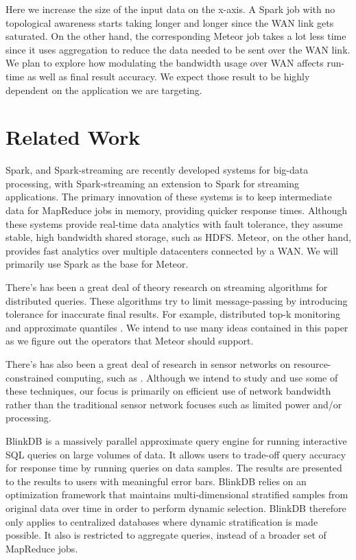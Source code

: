 \documentclass{article}
\begin{document}
Here we increase the size of the input data on the x-axis. A Spark job with no topological awareness starts taking longer and longer since the WAN link gets saturated. On the other hand, the corresponding Meteor job takes a lot less time since it uses aggregation to reduce the data needed to be sent over the WAN link. We plan to explore how modulating the bandwidth usage over WAN affects run-time as well as final result accuracy. We expect those result to be highly dependent on the application we are targeting.

\section{Related Work}

Spark, and Spark-streaming \cite{1} are recently developed systems for big-data processing, with Spark-streaming an extension to Spark for streaming applications. The primary innovation of these systems is to keep intermediate data for MapReduce jobs in memory, providing quicker response times. Although these systems provide real-time data analytics with fault tolerance, they assume stable, high bandwidth shared storage, such as HDFS. Meteor, on the other hand, provides fast analytics over multiple datacenters connected by a WAN. We will primarily use Spark as the base for Meteor.  

There’s has been a great deal of theory research on streaming algorithms for distributed queries. These algorithms try to limit message-passing by introducing tolerance for inaccurate final results. For example, distributed top-k monitoring \cite{3} and approximate quantiles \cite{6}. We intend to use many ideas contained in this paper as we figure out the operators that Meteor should support. 

There’s has also been a great deal of research in sensor networks on resource-constrained computing, such as \cite{7}. Although we intend to study and use some of these techniques, our focus is primarily on efficient use of network bandwidth rather than the traditional sensor network focuses such as limited power and/or processing.  

BlinkDB \cite{5} is a massively parallel approximate query engine for running interactive SQL queries on large volumes of data. It allows users to trade-off query accuracy for response time by running queries on data samples. The results are presented to the results to users with meaningful error bars. BlinkDB relies on an optimization framework that maintains multi-dimensional stratified samples from original data over time in order to perform dynamic selection. BlinkDB therefore only applies to centralized databases where dynamic stratification is made possible. It also is restricted to aggregate queries, instead of a broader set of MapReduce jobs.
\end{document}
